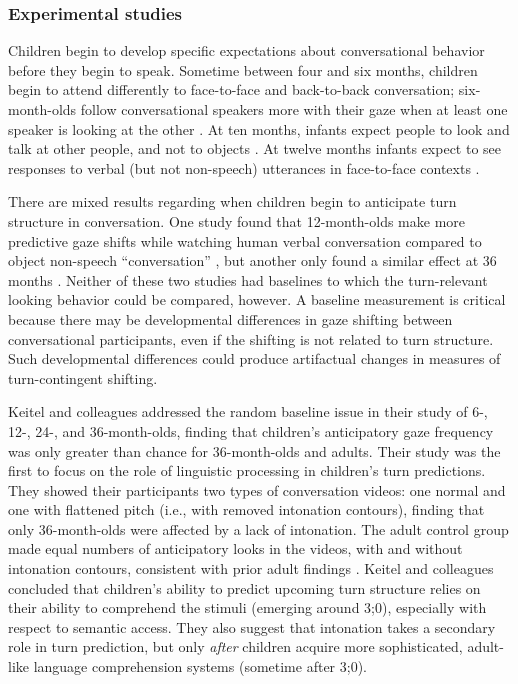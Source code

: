 \documentclass[authoryear, 12pt]{elsarticle}
\begin{document}
\subsubsection{Experimental studies}

Children begin to develop specific expectations about conversational behavior before they begin to speak. Sometime between four and six months, children begin to attend differently to face-to-face and back-to-back conversation; six-month-olds follow conversational speakers more with their gaze when at least one speaker is looking at the other \citep{augusti2010}. At ten months, infants expect people to look and talk at other people, and not to objects \citep{beier2012}. At twelve months infants expect to see responses to verbal (but not non-speech) utterances in face-to-face contexts \citep{thorgrimssonUndRev}.

There are mixed results regarding when children begin to anticipate turn structure in conversation. One study found that 12-month-olds make more predictive gaze shifts while watching human verbal conversation compared to object non-speech ``conversation'' \citep{bakker2011}, but another only found a similar effect at 36 months \citep{hofsten2009}. Neither of these two studies had baselines to which the turn-relevant looking behavior could be compared, however. A baseline measurement is critical because there may be developmental differences in gaze shifting between conversational participants, even if the shifting is not related to turn structure. Such developmental differences could produce artifactual changes in measures of turn-contingent shifting. 

Keitel and colleagues \citeyearpar{keitel2013} addressed the random baseline issue in their study of 6-, 12-, 24-, and 36-month-olds, finding that children's anticipatory gaze frequency was only greater than chance for 36-month-olds and adults. Their study was the first to focus on the role of linguistic processing in children's turn predictions. They showed their participants two types of conversation videos: one normal and one with flattened pitch (i.e., with removed intonation contours), finding that only 36-month-olds were affected by a lack of intonation. The adult control group made equal numbers of anticipatory looks in the videos, with and without intonation contours, consistent with prior adult findings \citep{de-ruiter2006}. Keitel and colleagues concluded that children's ability to predict upcoming turn structure relies on their ability to comprehend the stimuli (emerging around 3;0), especially with respect to semantic access. They also suggest that intonation takes a secondary role in turn prediction, but only \textit{after} children acquire more sophisticated, adult-like language comprehension systems (sometime after 3;0).
\end{document}
